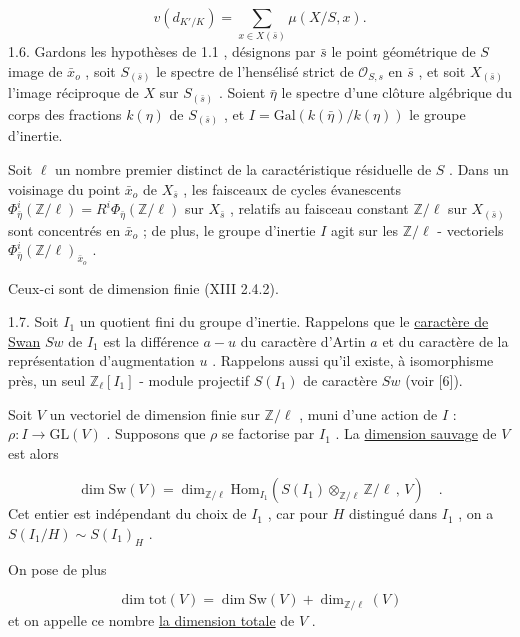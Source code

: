 \begin{equation}\tag{1.5.2}
v(d_{K'/K}) = \sum_{x \in X(\bar{s})} \mu(X/S,x).
\end{equation}
1.6. Gardons les hypothèses de 1.1 , désignons par $\bar{s}$ le point géométrique de $S$ image de $\bar{x}_o$ , soit $S_{(\bar{s})}$ le spectre de l'hensélisé strict de $\mathcal{O}_{S,s}$ en $\bar{s}$ , et soit $X_{(\bar{s})}$ l'image réciproque de $X$ sur $S_{(\bar{s})}$ . Soient $\bar{\eta}$ le spectre d'une clôture algébrique du corps des fractions $k(\eta)$ de $S_{(\bar{s})}$ , et $I = \mathrm{Gal}(k(\bar{\eta})/k(\eta))$ le groupe d'inertie.

Soit $\ell$ un nombre premier distinct de la caractéristique résiduelle de $S$ . Dans un voisinage du point $\bar{x}_o$ de $X_{\bar{s}}$ , les faisceaux de cycles évanescents $\Phi^i_{\bar{\eta}}(\mathbb{Z}/\ell) = R^i\Phi_{\bar{\eta}}(\mathbb{Z}/\ell)$ sur $X_{\bar{s}}$ , relatifs au faisceau constant $\mathbb{Z}/\ell$ sur $X_{(\bar{s})}$ sont concentrés en $\bar{x}_o$ ; de plus, le groupe d'inertie $I$ agit sur les $\mathbb{Z}/\ell$ - vectoriels $\Phi^i_{\bar{\eta}}(\mathbb{Z}/\ell)_{\bar{x}_o}$ .

Ceux-ci sont de dimension finie (XIII 2.4.2).

1.7. Soit $I_1$ un quotient fini du groupe d'inertie. Rappelons que le \underline{caractère de Swan} $Sw$ de $I_1$ est la différence $a - u$ du caractère d'Artin $a$ et du caractère de la représentation d'augmentation $u$ . Rappelons aussi qu'il existe, à isomorphisme près, un seul $\mathbb{Z}_\ell[I_1]$ - module projectif $S(I_1)$ de caractère $Sw$ (voir [6]).



Soit $V$ un vectoriel de dimension finie sur $\mathbb{Z}/\ell$ , muni d'une action de $I$ : $\rho : I \to \mathrm{GL}(V)$ . Supposons que $\rho$ se factorise par $I_1$ . La \underline{dimension sauvage} de $V$ est alors

\begin{equation}\tag{1.7.1}
\dim \mathrm{Sw}(V) = \dim_{\mathbb{Z}/\ell} \mathrm{Hom}_{I_1}(S(I_1) \otimes_{\mathbb{Z}/\ell} \mathbb{Z}/\ell \, , \, V) \quad .
\end{equation}
Cet entier est indépendant du choix de $I_1$ , car pour $H$ distingué dans $I_1$ , on a $S(I_1/H) \sim S(I_1)_H$ .

On pose de plus

\begin{equation*}
\dim \mathrm{tot}(V) = \dim \mathrm{Sw}(V) + \dim_{\mathbb{Z}/\ell}(V)
\end{equation*}
et on appelle ce nombre \underline{la dimension totale} de $V$ .

